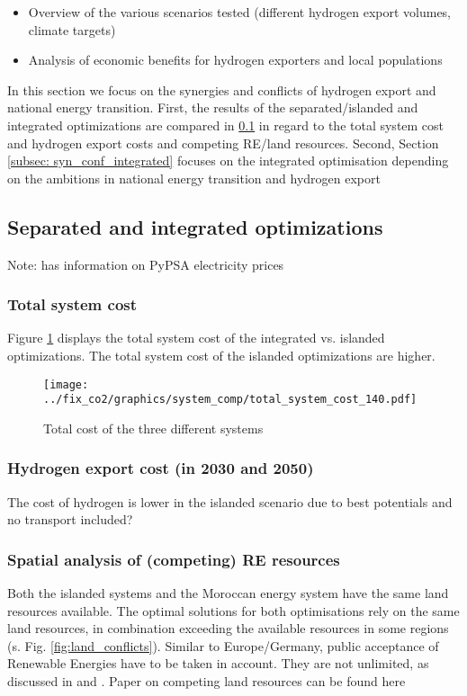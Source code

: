 \begin{itemize}
    \item Overview of the various scenarios tested (different hydrogen export volumes, climate targets)
    \item Analysis of economic benefits for hydrogen exporters and local populations
\end{itemize}

In this section we focus on the synergies and conflicts
of hydrogen export and national energy transition.
First, the results of the separated/islanded and integrated optimizations
are compared in \ref{subsec: sep_int_opti} in regard to the total system cost and
hydrogen export costs and competing RE/land resources.
Second, Section \ref{subsec: syn_conf_integrated} focuses on the integrated optimisation 
depending on the ambitions in national energy transition and hydrogen export



\subsection{Separated and integrated optimizations}
\label{subsec: sep_int_opti}

Note: \cite{Zeyen2022} has information on PyPSA electricity prices

\subsubsection{Total system cost}
Figure \ref{fig:int_sep_total_system_cost} displays the total system cost
of the integrated vs. islanded optimizations. The total system cost of the
islanded optimizations are higher.

\begin{figure}[h!]
    \centering
    \texttt{[image: ../fix\_co2/graphics/system\_comp/total\_system\_cost\_140.pdf]}
    \caption{Total cost of the three different systems}
    \label{fig:int_sep_total_system_cost}
\end{figure}

\subsubsection{Hydrogen export cost (in 2030 and 2050)}
The cost of hydrogen is lower in the islanded scenario due to best potentials and no transport included?

\subsubsection{Spatial analysis of (competing) RE resources}
Both the islanded systems and the Moroccan energy system have the same land resources available. 
The optimal solutions for both optimisations rely on the same land resources, in combination exceeding the 
available resources in some regions (s. Fig. \ref{fig:land_conflicts}). 
Similar to Europe/Germany, public acceptance of Renewable Energies have to be taken in account. 
They are not unlimited, as discussed in \cite{Hanger2016} and \cite{TerraponPfaff2019}.
Paper on competing land resources can be found here \cite{Patankar2022}


